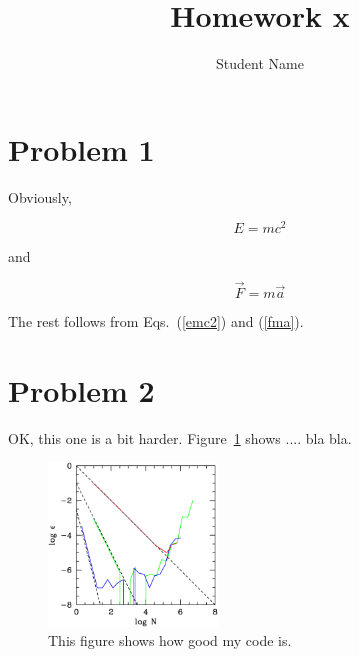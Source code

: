 
\pagestyle{plain}
\baselineskip 18pt
\textwidth 6.5in
\textheight 7.8in
\oddsidemargin 0.1in
\evensidemargin 0.1in
\topmargin 0.3in
\parindent 0pt

\newcommand{\beq}{\begin{equation}}
  \newcommand{\eeq}{\end{equation}}
\def\om{\Omega_m}




\title{Homework x}
\author{Student Name}
\maketitle

\section{Problem 1}

Obviously,

\beq
E=m c^2
\label{emc2}
\eeq

and

\beq
\vec{F} = m \vec{a}
\label{fma}
\eeq

The rest follows from Eqs.~(\ref{emc2}) and (\ref{fma}).

\section{Problem 2}


OK, this one is a bit harder. Figure~\ref{figeps} shows .... bla bla.

\begin{figure}[h]
\begin{center}
\includegraphics[width=0.4\textwidth]{figure1.ps}
\caption{This figure shows how good my code is.}
\label{figeps}
\end{center}
\end{figure}




